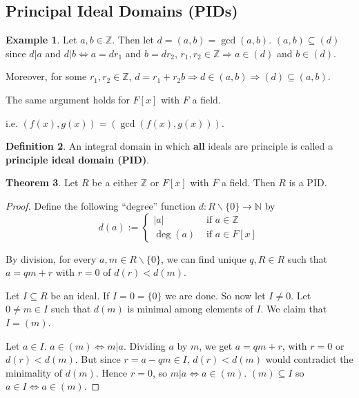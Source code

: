\documentclass[12pt,a4paper]{article}
\theoremstyle{definition}
\newtheorem{definition}{Definition}[subsection]
\newtheorem{theorem}[definition]{Theorem}
\newtheorem{example}[definition]{Example}
\begin{document}
\subsection{Principal Ideal Domains (PIDs)}

\begin{example}
	Let $a, b \in \mathbb{Z}$. Then let $d = (a, b) = \gcd(a, b)$. $(a, b) \subseteq (d)$ since $d | a$ and $d | b \Leftrightarrow a = d r_1$ and $b = d r_2$, $r_1, r_2 \in \mathbb{Z} \Rightarrow a \in (d)$ and $b \in (d)$.

	Moreover, for some $r_1, r_2 \in \mathbb{Z}$, $d = r_1 + r_2 b \Rightarrow d \in (a, b) \Rightarrow (d) \subseteq (a, b)$.


	The same argument holds for $F[x]$ with $F$ a field.

	i.e. $(f(x), g(x)) = (\gcd(f(x), g(x)))$.
\end{example}

\begin{definition}
	An integral domain in which \textbf{all} ideals are principle is called a \textbf{principle ideal domain (PID)}.
\end{definition}

\begin{theorem}
	Let $R$ be a either $\mathbb{Z}$ or $F[x]$ with $F$ a field. Then $R$ is a PID.
\end{theorem}

\begin{proof}
	Define the following ``degree'' function $d: R \backslash \{0\} \rightarrow \mathbb{N}$ by
	\[
		d(a) := \begin{cases}
			|a| & \text{ if } a \in \mathbb{Z} \\
			\deg(a) & \text{ if } a \in F[x]
		\end{cases}
	\]

	By division, for every $a, m \in R \backslash \{0\}$, we can find unique $q, R \in R$ such that $a = qm + r$ with $r = 0$ of $d(r) < d(m)$.

	Let $I \subseteq R$ be an ideal. If $I = 0 = \{0\}$ we are done. So now let $I \ne 0$. Let $0 \ne m \in I$ such that $d(m)$ is minimal among elements of $I$. We claim that $I = (m)$.

	Let $a \in I$. $a \in (m) \Leftrightarrow m | a$. Dividing $a$ by $m$, we get $a = qm + r$, with $r = 0$ or $d(r) < d(m)$. But since $r = a - qm \in I$, $d(r) < d(m)$ would contradict the minimality of $d(m)$. Hence $r = 0$, so $m | a \Leftrightarrow a \in (m)$. $(m) \subseteq I$ so $a \in I \Leftrightarrow a \in (m)$.
\end{proof}
\end{document}
